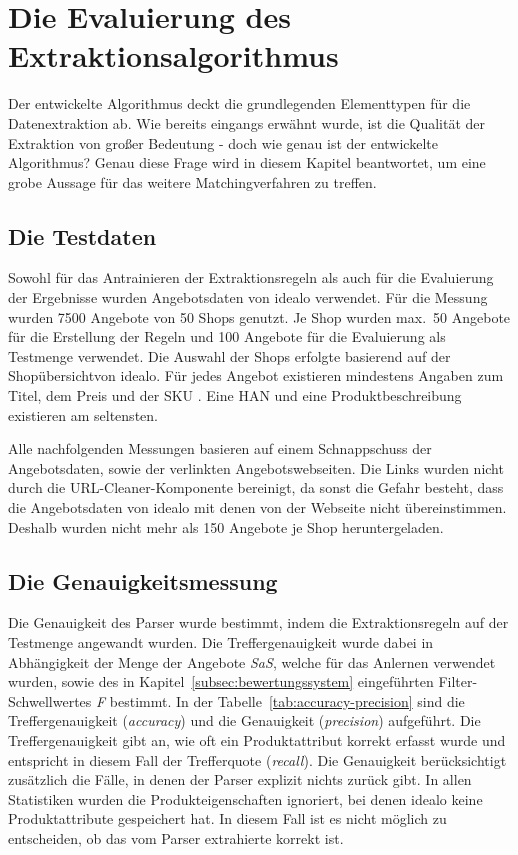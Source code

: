 \section{Die Evaluierung des Extraktionsalgorithmus}
\label{sec:evaluierung}

Der entwickelte Algorithmus deckt die grundlegenden Elementtypen für die Datenextraktion ab.
Wie bereits eingangs erwähnt wurde, ist die Qualität der Extraktion von großer Bedeutung - doch wie genau ist der
entwickelte Algorithmus?
Genau diese Frage wird in diesem Kapitel beantwortet, um eine grobe Aussage für das weitere Matchingverfahren zu
treffen.

\subsection{Die Testdaten}
\label{subsec:testdaten}
Sowohl für das Antrainieren der Extraktionsregeln als auch für die Evaluierung der Ergebnisse wurden Angebotsdaten
von idealo verwendet.
Für die Messung wurden 7500 Angebote von 50 Shops genutzt.
Je Shop wurden max.\ 50 Angebote für die Erstellung der Regeln und 100 Angebote für die Evaluierung als Testmenge
verwendet.
Die Auswahl der Shops erfolgte basierend auf der Shopübersicht\footnotemark von idealo.
Für jedes Angebot existieren mindestens Angaben zum Titel, dem Preis und der SKU .
Eine HAN und eine Produktbeschreibung existieren am seltensten.

Alle nachfolgenden Messungen basieren auf einem Schnappschuss der Angebotsdaten, sowie der verlinkten Angebotswebseiten.
Die Links wurden nicht durch die URL-Cleaner-Komponente bereinigt, da sonst die Gefahr besteht, dass die
Angebotsdaten von idealo mit denen von der Webseite nicht übereinstimmen.
Deshalb wurden nicht mehr als 150 Angebote je Shop heruntergeladen.

\subsection{Die Genauigkeitsmessung}
\label{subsec:genauigkeitsmessung}
Die Genauigkeit des Parser wurde bestimmt, indem die Extraktionsregeln auf der Testmenge angewandt wurden.
Die Treffergenauigkeit wurde dabei in Abhängigkeit der Menge der Angebote \textit{SaS}, welche für das Anlernen
verwendet wurden, sowie des in Kapitel~\ref{subsec:bewertungssystem} eingeführten Filter-Schwellwertes \textit{F}
bestimmt.
In der Tabelle~\ref{tab:accuracy-precision} sind die Treffergenauigkeit (\textit{accuracy}) und die Genauigkeit
(\textit{precision}) aufgeführt.
Die Treffergenauigkeit gibt an, wie oft ein Produktattribut korrekt erfasst wurde und entspricht in diesem Fall der
Trefferquote (\textit{recall}).
Die Genauigkeit berücksichtigt zusätzlich die Fälle, in denen der Parser explizit nichts zurück gibt.
In allen Statistiken wurden die Produkteigenschaften ignoriert, bei denen idealo keine Produktattribute gespeichert hat.
In diesem Fall ist es nicht möglich zu entscheiden, ob das vom Parser extrahierte korrekt ist.

